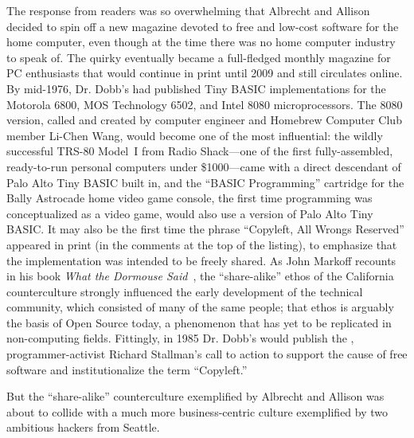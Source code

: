 The response from readers was so overwhelming that Albrecht and
Allison decided to spin off a new magazine devoted to free and
low-cost software for the home computer, even though at the time there
was no home computer industry to speak of.
The quirky  eventually became a full-fledged
monthly magazine for PC enthusiasts that would continue in print until
2009 and still circulates online.
By mid-1976, Dr. Dobb's had published Tiny BASIC implementations
for the Motorola 6800, MOS Technology 6502, and Intel 8080
microprocessors.
The 8080 version, called  and created by computer engineer
and Homebrew Computer Club member Li-Chen Wang, would become one of the
most influential: the wildly successful TRS-80 Model~I from Radio Shack---one of the first 
fully-assembled, ready-to-run
personal computers under \$1000---came with a direct descendant of
Palo Alto Tiny BASIC built in, and the 
``BASIC Programming'' cartridge for the Bally Astrocade
home video game console, the first time programming
was conceptualized as a video game,
would also use a version of Palo Alto Tiny
BASIC.
It may also be the first time
the phrase ``Copyleft, All Wrongs Reserved'' appeared in print (in the
comments at the top of the listing), to emphasize that the
implementation was intended to be freely shared.
As John Markoff recounts in his book \emph{What the Dormouse Said}~\cite{dormouse},
the ``share-alike'' ethos of the California counterculture strongly
influenced the early development of the technical community, which
consisted of many of the same people; that ethos is arguably the
basis of Open Source today, a phenomenon that has yet to be replicated
in non-computing fields.
Fittingly, in 1985 Dr. Dobb's would publish the ,
programmer-activist Richard Stallman's call to action to support the
cause of free software and institutionalize the term ``Copyleft.''

But the ``share-alike'' counterculture exemplified by Albrecht and
Allison was about to collide with a much more business-centric culture
exemplified by two ambitious hackers from Seattle.




